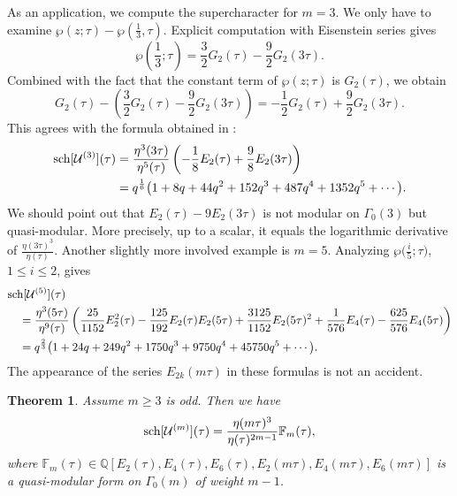 \documentclass[10pt,a4paper]{amsart}
\numberwithin{equation}{section}
\newtheorem{Theorem}{Theorem}[section]
\theoremstyle{definition}
\begin{document}
As an application, we compute the supercharacter for $m=3$.
We only have to examine $\wp(z;\tau)-\wp(\frac{1}{3},\tau)$.
Explicit computation with Eisenstein series gives
\[
\wp\left(\frac13;\tau\right)=\frac32G_2(\tau)-\frac{9}{2}G_2(3 \tau).
\]
Combined with the fact that the constant term of $\wp(z;\tau)$ is $G_2(\tau)$, we obtain
\[
G_2(\tau)-(\frac32G_2(\tau)-\frac{9}{2}G_2(3 \tau) )=-\frac12 G_2(\tau)+\frac92 G_2(3 \tau).
\]
This agrees with the formula obtained in \cite{AM}:
\begin{align*}
{\rm sch}[\mathcal{U}^{(3)}](\tau)&=\frac{\eta^{3}(3 \tau)}{\eta^5(\tau)}\left(-\frac{1}{8}E_{2}(\tau)+\frac98 E_{2}(3 \tau)\right) \\
&=q^{\frac16}\bigl(1+8q+44q^2+152q^3+487q^4+1352q^5+\cdots\bigr).
\end{align*}
We should point out that $E_{2}(\tau)-9 E_{2}(3 \tau)$ is not modular on $\Gamma_0(3)$ but quasi-modular. More precisely, up to a scalar, it equals the logarithmic
derivative of $\frac{\eta(3 \tau)^3}{\eta(\tau)}$.
Another slightly more involved example is $m=5$. Analyzing $\wp\bigl(\frac{i}{5};\tau\bigr)$, $ 1\leq i \leq 2$, gives
\begin{align*}
&{\rm sch}[\mathcal{U}^{(5)}](\tau) \\
&\quad= \frac{\eta^{3}(5 \tau)}{\eta^9(\tau)}\left( \frac{25}{1152} E^2_{2}(\tau)- \frac{125}{192} E_{2}(\tau) E_2(5 \tau) +\frac{3125}{1152} E_2(5 \tau)^2 +\frac{1}{576}
E_4(\tau)-\frac{625}{576}E_4(5 \tau) \right) \\
 & \quad =q^{\frac23}\bigl(1 + 24 q + 249 q^2 + 1750 q^3 + 9750 q^4 + 45750 q^5+ \cdots \bigr).
\end{align*}
The appearance of the series $E_{2k}(m \tau)$ in these formulas is not an accident.

\begin{Theorem} \label{charum} Assume $m\geq3$ is odd. Then we have
\[
{\rm sch}[\mathcal{U}^{(m)}](\tau)= \frac{\eta(m \tau)^3}{\eta(\tau)^{2m-1}} \mathbb{F}_m(\tau),
\]
where $\mathbb{F}_m(\tau) \in \mathbb{Q}[E_2(\tau),E_4(\tau),E_6(\tau),E_2(m \tau),E_4(m \tau),E_6(m \tau)]$ is a quasi-modular form on $\Gamma_0(m)$ of weight $m-1$.
\end{Theorem}
\end{document}
